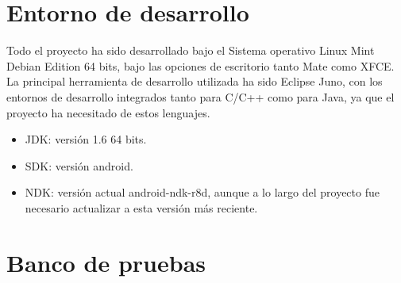\section{Entorno de desarrollo}
Todo el proyecto ha sido desarrollado bajo el Sistema operativo Linux Mint Debian Edition 64 bits, bajo las opciones de escritorio tanto Mate como XFCE.\\

La principal herramienta de desarrollo utilizada ha sido Eclipse Juno, con los entornos de desarrollo integrados tanto para C/C++ como para Java, ya que el proyecto ha necesitado de estos lenguajes.
\begin{itemize}
\item JDK: versión 1.6 64 bits.
\item SDK: versión android.
\item NDK: versión actual android-ndk-r8d, aunque a lo largo del proyecto fue necesario actualizar a esta versión más reciente.
\end{itemize}
\section{Banco de pruebas}
